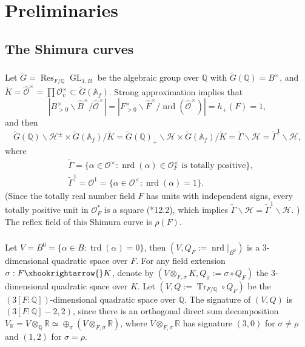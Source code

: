 \documentclass{amsart}
\numberwithin{equation}{subsection}
\numberwithin{theorem}{section}
\theoremstyle{definition}
\theoremstyle{remark}
\newcommand{\bA}{\mathbb{A}}
\newcommand{\bQ}{\mathbb{Q}}
\newcommand{\bR}{\mathbb{R}}
\newcommand{\cO}{\mathcal{O}}
\DeclareMathOperator{\GL}{GL}
\DeclareMathOperator{\Tr}{Tr}
\DeclareMathOperator{\trd}{trd}
\DeclareMathOperator{\nrd}{nrd}
\DeclareMathOperator{\Res}{Res}
\begin{document}
\section{Preliminaries}

\subsection{The Shimura curves}

\subsubsection{}
Let $\widetilde{G} = \Res_{F/\bQ}\GL_{1,B}$ be the algebraic group over $\bQ$ with $\widetilde{G}(\bQ) = B^\times$, and $\widetilde{K} = \widehat{\mathcal{O}}^\times = \prod \mathcal{O}_v^\times \subset \widetilde{G}(\bA_f)$. Strong approximation implies that \begin{equation}\label{eq:strongapprox}|B^\times_{>0} \backslash \widehat{B}^\times / \widehat{\mathcal{O}}^\times| = |F^\times_{>0} \backslash \widehat{F}^\times / \nrd(\widehat{\mathcal{O}}^\times)| = h_+(F) = 1,\end{equation} 
and then \[\widetilde{G}(\bQ)\backslash \mathcal{H}^{\pm} \times \widetilde{G}(\bA_f) / \widetilde{K} = \widetilde{G}(\bQ)_+ \backslash \mathcal{H} \times \widetilde{G}(\bA_f) / \widetilde{K} = \widetilde{\Gamma} \backslash \mathcal{H} = \widetilde{\Gamma}^1 \backslash \mathcal{H},\] where \begin{align*}
    &\widetilde{\Gamma} = \{\alpha \in \mathcal{O}^\times : \nrd(\alpha) \in \mathcal{O}_F^\times \text{ is totally positive}\},\\
    &\widetilde{\Gamma}^1 = \cO^1 = \{\alpha \in \mathcal{O}^\times : \nrd(\alpha) = 1\}.
\end{align*}
(Since the totally real number field $F$ has units with independent signs, every totally positive unit in $\mathcal{O}_F^*$ is a square (\cite{MR963648}*{12.2}), which implies $\widetilde{\Gamma} \backslash \mathcal{H} = \widetilde{\Gamma}^1 \backslash \mathcal{H}$. )
The reflex field of this Shimura curve is $\rho(F)$. 

\subsubsection{}\label{sec:ShimuraDatum}
Let $V = B^0= \{\alpha \in B: \trd(\alpha) = 0\}$, then $(V, Q_F:=\nrd|_{B^0})$ is a $3$-dimensional quadratic space over $F$. For any field extension $\sigma:F\xhookrightarrow{}K$, denote by $(V\otimes_{F, \sigma} K, Q_{\sigma}:=\sigma\circ Q_F)$ the $3$-dimensional quadratic space over $K$. Let $(V, Q := \Tr_{F/\bQ}\circ Q_F)$ be the $(3[F:\bQ])$-dimensional quadratic space over $\bQ$. The signature of $(V, Q)$ is $(3[F:\bQ]-2,2)$, since there is an orthogonal direct sum decomposition $V_{\bR}= V\otimes_{\bQ}\bR \simeq \oplus_{\sigma} (V\otimes_{F,\sigma}\mathbb{R})$, where $V\otimes_{F, \sigma}\bR$ has signature $(3,0)$ for $\sigma \neq \rho$ and $(1,2)$ for $\sigma = \rho$. 
\end{document}
